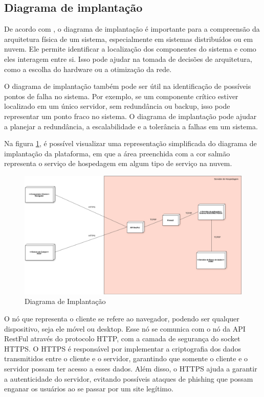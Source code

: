 \documentclass[tcc,capa]{texufpel}
\begin{document}
\subsection{Diagrama de implantação}
De acordo com \citet{LARMAN:2011}, o diagrama de implantação é importante para a compreensão da arquitetura física de um sistema, especialmente em sistemas distribuídos ou em nuvem. Ele permite identificar a localização dos componentes do sistema e como eles interagem entre si. Isso pode ajudar na tomada de decisões de arquitetura, como a escolha do hardware ou a otimização da rede.

O diagrama de implantação também pode ser útil na identificação de possíveis pontos de falha no sistema. Por exemplo, se um componente crítico estiver localizado em um único servidor, sem redundância ou backup, isso pode representar um ponto fraco no sistema. O diagrama de implantação pode ajudar a planejar a redundância, a escalabilidade e a tolerância a falhas em um sistema. \cite{OMG:2017}

Na figura \ref{diagramaimplantacao}, é possível visualizar uma representação simplificada do diagrama de implantação da plataforma, em que a área preenchida com a cor salmão representa o serviço de hospedagem em algum tipo de serviço na nuvem.

\begin{figure}[htbp]
  \centering \includegraphics[scale=.3]{assets/diagramaimplantacao.png}
  \caption{Diagrama de Implantação}
  \label{diagramaimplantacao}
\end{figure}

O nó que representa o cliente se refere ao navegador, podendo ser qualquer dispositivo, seja ele móvel ou desktop. Esse nó se comunica com o nó da API RestFul através do protocolo HTTP, com a camada de segurança do socket HTTPS. O HTTPS é responsável por implementar a criptografia dos dados transmitidos entre o cliente e o servidor, garantindo que somente o cliente e o servidor possam ter acesso a esses dados. Além disso, o HTTPS ajuda a garantir a autenticidade do servidor, evitando possíveis ataques de phishing que possam enganar os usuários ao se passar por um site legítimo.
\end{document}
